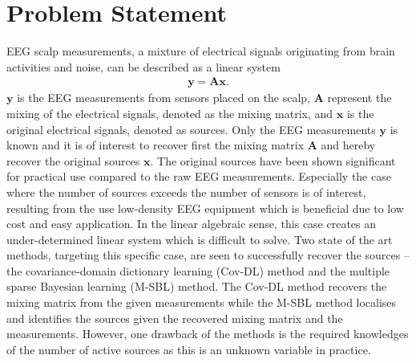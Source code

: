 \chapter{Problem Statement}\label{ch:problemstatement}
EEG scalp measurements, a mixture of electrical signals originating from brain activities and noise, can be described as a linear system
\begin{align*}
\mathbf{y} = \mathbf{Ax}.
\end{align*}
$\mathbf{y}$ is the EEG measurements from sensors placed on the scalp, $\mathbf{A}$ represent the mixing of the electrical signals, denoted as the mixing matrix, and $\mathbf{x}$ is the original electrical signals, denoted as sources. 
Only the EEG measurements $\mathbf{y}$ is known and it is of interest to recover first the mixing matrix $\mathbf{A}$ and hereby recover the original sources $\mathbf{x}$. The original sources have been shown significant for practical use compared to the raw EEG measurements. 
Especially the case where the number of sources exceeds the number of sensors is of interest, resulting from the use low-density EEG equipment which is beneficial due to low cost and easy application. 
In the linear algebraic sense, this case creates an under-determined linear system which is difficult to solve.
Two state of the art methods, targeting this specific case, are seen to successfully recover the sources -- the covariance-domain dictionary learning (Cov-DL) method and the multiple sparse Bayesian learning (M-SBL) method. 
The Cov-DL method recovers the mixing matrix from the given measurements while the M-SBL method localises and identifies the sources given the recovered mixing matrix and the measurements. 
However, one drawback of the methods is the required knowledges of the number of active sources as this is an unknown variable in practice. 


